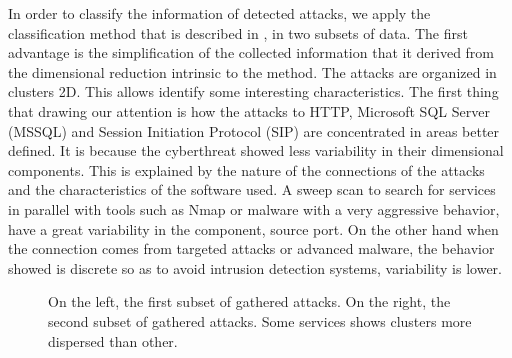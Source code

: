 \documentclass[a4paper]{llncs}
\begin{document}
In order to classify the information of detected attacks, we apply the classification method that is described in \cite{panda-2009}, in two subsets of data. The first advantage is the simplification of the collected information that it derived from the dimensional reduction intrinsic to the method. The attacks are organized in clusters 2D.  This allows identify some interesting characteristics. The first thing that drawing our attention is how the attacks to HTTP, Microsoft SQL Server (MSSQL) and Session Initiation Protocol (SIP) are concentrated in areas better defined. It is because the cyberthreat showed less variability in their dimensional components. This is explained by the nature of the connections of the attacks and the characteristics of the software used. A sweep scan to search for services in parallel with tools such as Nmap\cite{nmap} or malware with a very aggressive behavior, have a great variability in the component, source port. On the other hand when the connection comes from targeted attacks or advanced malware, the behavior showed is discrete so as to avoid intrusion detection systems, variability is lower.

\begin{figure}[h]
	\label{fig:intvsextDionaea}
	\label{fig:intvsextKippo}
	\caption{On the left, the first subset of gathered attacks. On the right, the second subset of gathered attacks. Some services shows clusters more dispersed than other.}
\end{figure}
\end{document}
